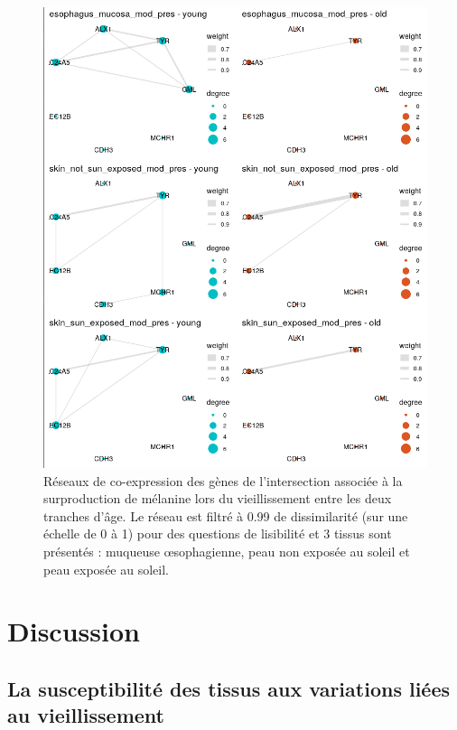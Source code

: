 \begin{figure}[p]
    \centering
    \includegraphics[width=1\textwidth]{img/chap2/chap2_graphs_intersection_melanine.png}
    \caption{Réseaux de co-expression des gènes de l'intersection associée à la surproduction de mélanine lors du vieillissement entre les deux tranches d'âge. Le réseau est filtré à 0.99 de dissimilarité (sur une échelle de 0 à 1) pour des questions de lisibilité et 3 tissus sont présentés : muqueuse œsophagienne, peau non exposée au soleil et peau exposée au soleil.}
    \label{figure:graphs_intersection_melanine}
\end{figure}


\section{Discussion}

\subsection{La susceptibilité des tissus aux variations liées au vieillissement}

